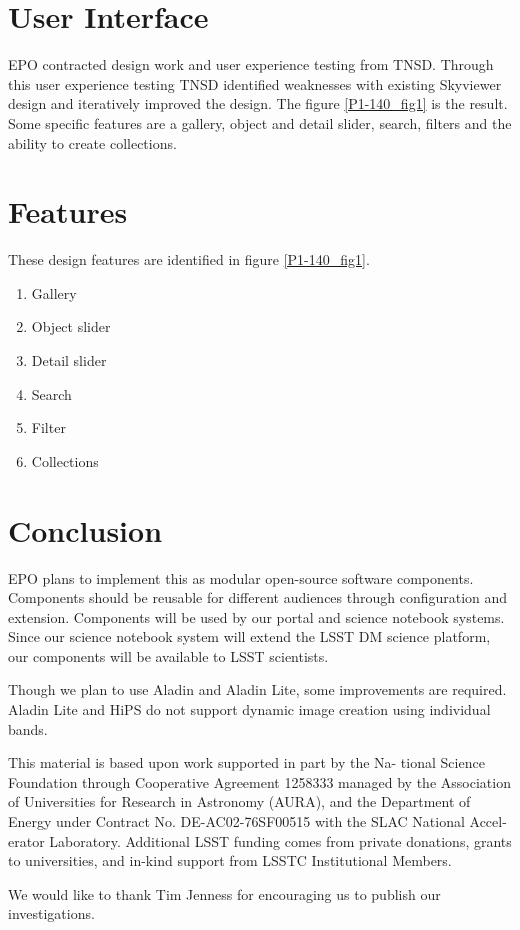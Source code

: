 \documentclass[11pt,twoside]{article}
\begin{document}
\section{User Interface}

EPO contracted design work and user experience testing from TNSD. Through this user experience testing TNSD identified weaknesses with existing Skyviewer design and iteratively improved the design. The figure \ref{P1-140_fig1} is the result. Some specific features are a gallery, object and detail slider, search, filters and the ability to create collections.

\section{Features}
These design features are identified in figure \ref{P1-140_fig1}.
\begin{enumerate}
\item Gallery
\item Object slider
\item Detail slider
\item Search
\item Filter
\item Collections
\end{enumerate}


\section{Conclusion}
EPO plans to implement this as modular open-source software components. Components should be reusable for different audiences through configuration and extension. Components will be used by our portal and science notebook systems. Since our science notebook system will extend the LSST DM science platform\footnotemark[13], our components will be available to LSST scientists.


Though we plan to use Aladin and Aladin Lite, some improvements are required. Aladin Lite and HiPS do not support dynamic image creation using individual bands.

\acknowledgements This material is based upon work supported in part by the Na- tional Science Foundation through Cooperative Agreement 1258333 managed by the Association of Universities for Research in Astronomy (AURA), and the Department of Energy under Contract No. DE-AC02-76SF00515 with the SLAC National Accel- erator Laboratory. Additional LSST funding comes from private donations, grants to universities, and in-kind support from LSSTC Institutional Members.

We would like to thank Tim Jenness for encouraging us to publish our investigations.

\end{document}

